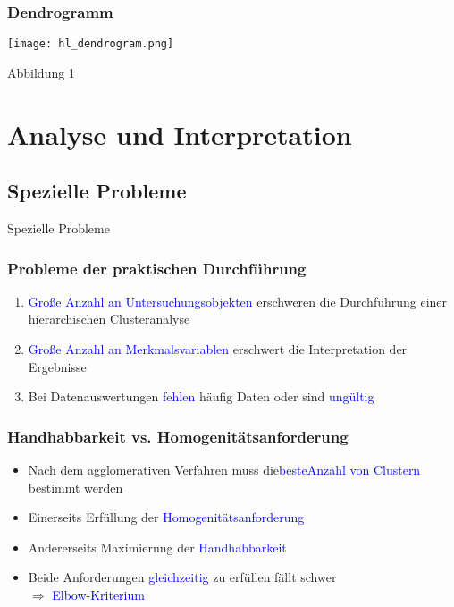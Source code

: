 \documentclass{beamer}
\begin{document}
\begin{frame}
 \frametitle{Dendrogramm}

 \centerline{{\texttt{[image: hl\_dendrogram.png]}}}
 \centerline{Abbildung 1}

\end{frame}








\section{Analyse und Interpretation}

\subsection{Spezielle Probleme}

\begin{frame}
 \centerline{Spezielle Probleme}
\end{frame}

\begin{frame}
 \frametitle{Probleme der praktischen Durchführung}

 \begin{enumerate}
  \item \textcolor{blue}{Große Anzahl an Untersuchungsobjekten} erschweren die Durchführung einer hierarchischen Clusteranalyse
  \item \textcolor{blue}{Große Anzahl an Merkmalsvariablen} erschwert die Interpretation der Ergebnisse
  \item Bei Datenauswertungen \textcolor{blue}{fehlen} häufig Daten oder sind \textcolor{blue}{ungültig}
 \end{enumerate}

\end{frame}

\begin{frame}
 \frametitle{Handhabbarkeit vs. Homogenitätsanforderung}

 \begin{itemize}
  \item Nach dem agglomerativen Verfahren muss die\textcolor{blue}{\glqq beste\grqq Anzahl von Clustern} bestimmt werden
  \item Einerseits Erfüllung der \textcolor{blue}{Homogenitätsanforderung}
  \item Andererseits Maximierung der \textcolor{blue}{Handhabbarkeit}
  \item Beide Anforderungen \textcolor{blue}{gleichzeitig} zu erfüllen fällt schwer \\
  $\Rightarrow$ \textcolor{blue}{Elbow-Kriterium}
 \end{itemize}

\end{frame}
\end{document}
